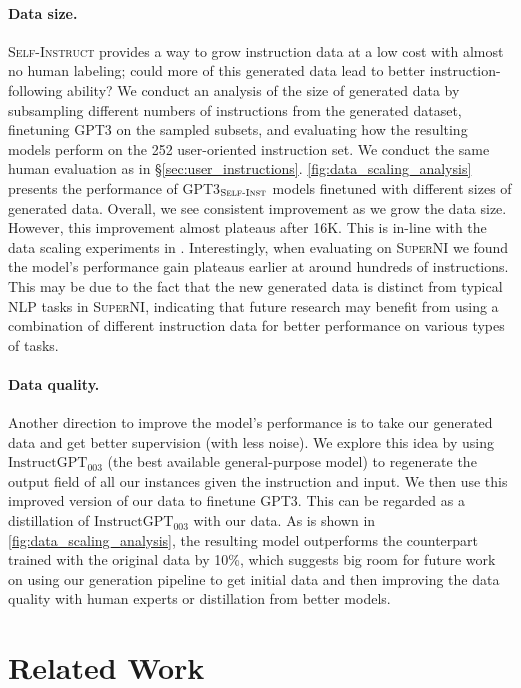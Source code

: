 \paragraph{Data size.}
\textsc{Self-Instruct} provides a way to grow instruction data at a low cost with almost no human labeling; could more of this generated data lead to better instruction-following ability? We conduct an analysis of the size of generated data by subsampling different numbers of instructions from the generated dataset, finetuning \textsc{GPT3} on the sampled subsets, and evaluating how the resulting models perform on the 252 user-oriented instruction set. We conduct the same human evaluation as in \S\ref{sec:user_instructions}.
\autoref{fig:data_scaling_analysis} presents the performance of \textsc{GPT3}$_{\textsc{Self-Inst}}$ models finetuned with different sizes of generated data. Overall, we see consistent improvement as we grow the data size. However, this improvement almost plateaus after 16K. This is in-line with the data scaling experiments in \citet[Fig.~5]{wang2022benchmarking}.
Interestingly, when evaluating on \textsc{SuperNI} we found the model's performance gain plateaus earlier at around hundreds of instructions. This may be due to the fact that the new generated data is distinct from typical NLP tasks in \textsc{SuperNI}, indicating that future research may benefit from using a combination of different instruction data for better performance on various types of tasks.

\paragraph{Data quality.} Another direction to improve the model's performance is to take our generated data and get better supervision (with less noise). We explore this idea by using $\text{InstructGPT}_{\text{003}}$ (the best available general-purpose model) to regenerate the output field of all our instances given the instruction and input. We then use this improved version of our data to finetune \textsc{GPT3}. This can be regarded as a distillation of $\text{InstructGPT}_{\text{003}}$ with our data. As is shown in \autoref{fig:data_scaling_analysis}, the resulting model outperforms the counterpart trained with the original data by 10\%, which suggests big room for future work on using our generation pipeline to get initial data and then improving the data quality with human experts or distillation from better models.

\section{Related Work}
\label{sec:related}

